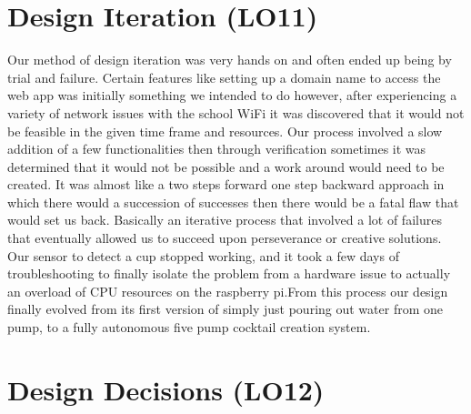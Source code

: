 \documentclass{article}
\begin{document}
\section{Design Iteration (LO11)}
Our method of design iteration was very hands on and often ended up being by trial and failure. Certain features like setting up a domain name to access the web app was initially something we intended to do however, after experiencing a variety of network issues with the school WiFi it was discovered that it would not be feasible in the given time frame and resources. Our process involved a slow addition of a few functionalities then through verification sometimes it was determined that it would not be possible and a work around would need to be created. It was almost like a two steps forward one step backward approach in which there would a succession of successes then there would be a fatal flaw that would set us back. Basically an iterative process that involved a lot of failures that eventually allowed us to succeed upon perseverance or creative solutions. Our sensor to detect a cup stopped working, and it took a few days of troubleshooting to finally isolate the problem from a hardware issue to actually an overload of CPU resources on the raspberry pi.From this process our design finally evolved from its first version of simply just pouring out water from one pump, to a fully autonomous five pump cocktail creation system. 

\section{Design Decisions (LO12)}
\end{document}
